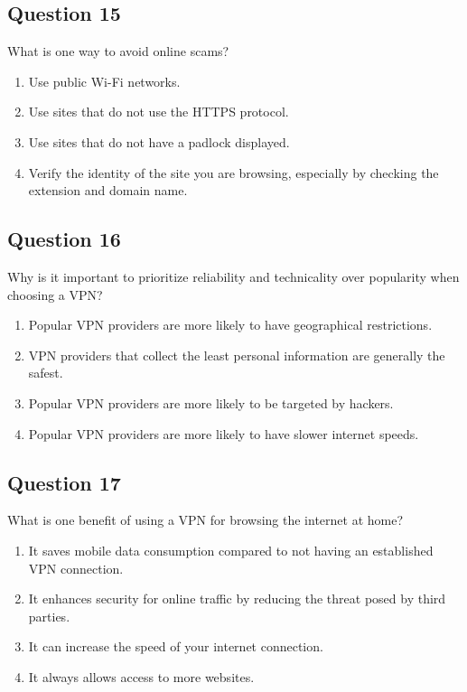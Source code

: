 \documentclass[12pt,a4paper]{article}
\begin{document}
\bigskip


\subsection*{Question 15}
What is one way to avoid online scams?

\begin{enumerate}[label=\Alph*., leftmargin=*]
\item Use public Wi-Fi networks.
\item Use sites that do not use the HTTPS protocol.
\item Use sites that do not have a padlock displayed.
\item Verify the identity of the site you are browsing, especially by checking the extension and domain name.
\end{enumerate}

\bigskip


\subsection*{Question 16}
Why is it important to prioritize reliability and technicality over popularity when choosing a VPN?

\begin{enumerate}[label=\Alph*., leftmargin=*]
\item Popular VPN providers are more likely to have geographical restrictions.
\item VPN providers that collect the least personal information are generally the safest.
\item Popular VPN providers are more likely to be targeted by hackers.
\item Popular VPN providers are more likely to have slower internet speeds.
\end{enumerate}

\bigskip


\subsection*{Question 17}
What is one benefit of using a VPN for browsing the internet at home?

\begin{enumerate}[label=\Alph*., leftmargin=*]
\item It saves mobile data consumption compared to not having an established VPN connection.
\item It enhances security for online traffic by reducing the threat posed by third parties.
\item It can increase the speed of your internet connection.
\item It always allows access to more websites.
\end{enumerate}
\end{document}
